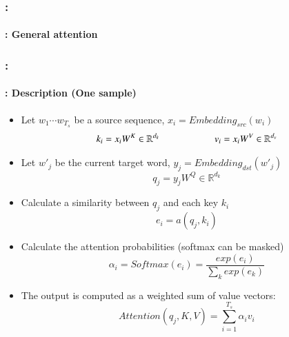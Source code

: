 \documentclass[xcolor=table]{beamer}
\begin{document}
	
	\begin{frame}
		\frametitle{\insertshortsubtitle: \insertsection}
		\framesubtitle{\insertsubsection: General attention}
		
		
	\end{frame}
	
	\begin{frame}
		\frametitle{\insertshortsubtitle: \insertsection}
		\framesubtitle{\insertsubsection: Description (One sample)}
		
		\begin{itemize}
		\item Let $ w_1 \cdots w_{T_s} $ be a source sequence, $x_i = Embedding_{src}(w_i)$
		\[k_i =  x_i W^K \in \mathbb{R}^{d_k} \hskip2cm v_i =  x_i W^V \in \mathbb{R}^{d_v}\]
		
		\item Let $ w'_j $ be the current target word, $y_j = Embedding_{dst}(w'_j)$
		\[q_j =  y_j W^Q \in \mathbb{R}^{d_k}\]

		\item Calculate a similarity between $q_j$ and each key $ k_i $
		\[e_i = a(q_j, k_i)\]
		
		\item Calculate the attention probabilities (softmax can be masked)
		\[\alpha_i = Softmax(e_i) = \frac{exp(e_i)}{\sum_k exp(e_k)}\] 
		
		\item The output is computed as a weighted sum of value vectors:
		\[Attention(q_j, K, V) = \sum_{i=1}^{T_s} \alpha_i v_i\]
		\end{itemize}
		
	\end{frame}
	
\end{document}

